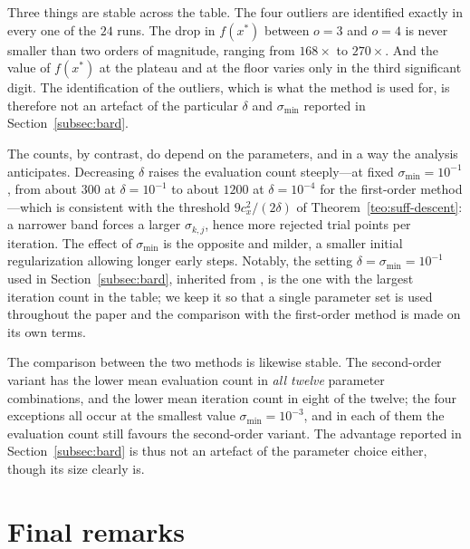 \documentclass[11pt]{article}
\begin{document}
Three things are stable across the table. The four outliers are identified
exactly in every one of the $24$ runs. The drop in $f(x^*)$ between $o=3$ and
$o=4$ is never smaller than two orders of magnitude, ranging from $168\times$ to
$270\times$. And the value of $f(x^*)$ at the plateau and at the floor varies
only in the third significant digit. The identification of the outliers, which
is what the method is used for, is therefore not an artefact of the particular
$\delta$ and $\sigma_{\min}$ reported in Section~\ref{subsec:bard}.

The counts, by contrast, do depend on the parameters, and in a way the analysis
anticipates. Decreasing $\delta$ raises the evaluation count steeply---at fixed
$\sigma_{\min}=10^{-1}$, from
about $300$ at $\delta=10^{-1}$ to about $1200$ at $\delta=10^{-4}$ for the
first-order method---which is consistent with the threshold
$9c_x^2/(2\delta)$ of Theorem~\ref{teo:suff-descent}: a narrower band forces a
larger $\sigma_{k,j}$, hence more rejected trial points per iteration. The
effect of $\sigma_{\min}$ is the opposite and milder, a smaller initial
regularization allowing longer early steps. Notably, the setting
$\delta=\sigma_{\min}=10^{-1}$ used in Section~\ref{subsec:bard}, inherited from
\cite{alvarezovo}, is the one with the largest iteration count in the table; we
keep it so that a single parameter set is used throughout the paper and the
comparison with the first-order method is made on its own terms.

The comparison between the two methods is likewise stable. The second-order
variant has the lower mean evaluation count in \emph{all twelve} parameter
combinations, and the lower mean iteration count in eight of the twelve; the
four exceptions all occur at the smallest value $\sigma_{\min}=10^{-3}$, and in
each of them the evaluation count still favours the second-order variant. The
advantage reported in Section~\ref{subsec:bard} is thus not an artefact of the
parameter choice either, though its size clearly is.

\section{Final remarks} \label{sec:final}
\end{document}
